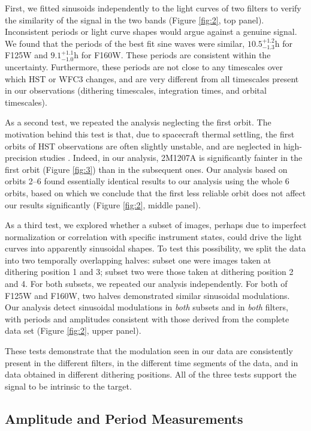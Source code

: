 \documentclass[apj]{emulateapj}
\begin{document}
First, we fitted sinusoids independently to the light curves of two
filters to verify the similarity of the signal in the two bands
(Figure \ref{fig:2}, top panel). Inconsistent periods or light curve
shapes would argue against a genuine signal.  We found that the periods
of the best fit sine waves were similar, $10.5^{+1.2}_{-1.3}$h for
F125W and $9.1^{+1.1}_{-1.0}$h for F160W. These periods are consistent
within the uncertainty. Furthermore, these periods are not close to
any timescales over which HST or WFC3 changes, and are
very different from all timescales present in our observations
(dithering timescales, integration times, and orbital timescales).

As a second test, we repeated the analysis neglecting the first
orbit. The motivation behind this test is that, due to spacecraft
thermal settling, the first orbits of HST observations are often
slightly unstable, and are neglected in high-precision studies
\citep[e.g.][]{Mandell2013}. Indeed, in our analysis, 2M1207A is
significantly fainter in the first orbit (Figure \ref{fig:3}) than in
the subsequent ones.  Our analysis based on orbits 2--6 found
essentially identical results to our analysis using the whole 6 orbits, based on
which we conclude that the first less reliable orbit does not affect
our results significantly (Figure \ref{fig:2}, middle panel).

As a third test, we explored whether a subset of images, perhaps due to
imperfect normalization or correlation with specific instrument states,
could drive the light curves into apparently sinusoidal shapes. To
test this possibility, we split the data into two temporally
overlapping halves: subset one were images taken at dithering position
1 and 3; subset two were those taken at dithering position 2 and
4. For both subsets, we repeated our analysis independently.  For both
of F125W and F160W, two halves demonstrated similar sinusoidal
modulations.  Our analysis detect sinusoidal modulations in {\em both}
subsets and in {\em both} filters, with periods and amplitudes
consistent with those derived from the complete data set (Figure
\ref{fig:2}, upper panel).
 
 These tests demonstrate that the modulation seen in our data are
 consistently present in the different filters, in the different time
 segments of the data, and in data obtained in different dithering
 positions. All of the three tests support the signal to be
 intrinsic to the target. 
 

\subsection{Amplitude and Period Measurements}
\end{document}
